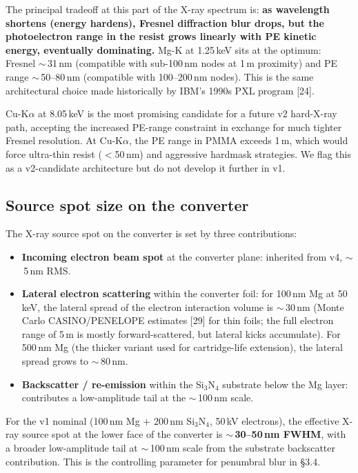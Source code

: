 \documentclass[11pt,letterpaper]{article}
\begin{document}
The principal tradeoff at this part of the X-ray spectrum is: \textbf{as wavelength shortens (energy hardens), Fresnel diffraction blur drops, but the photoelectron range in the resist grows linearly with PE kinetic energy, eventually dominating.} Mg-K at 1.25\,keV sits at the optimum: Fresnel $\sim$\,31\,nm (compatible with sub-100\,nm nodes at 1\,\textmu m proximity) and PE range $\sim$\,50--80\,nm (compatible with 100--200\,nm nodes). This is the same architectural choice made historically by IBM's 1990s PXL program [24].

Cu-K$\alpha$ at 8.05\,keV is the most promising candidate for a future v2 hard-X-ray path, accepting the increased PE-range constraint in exchange for much tighter Fresnel resolution. At Cu-K$\alpha$, the PE range in PMMA exceeds 1\,\textmu m, which would force ultra-thin resist ($<$50\,nm) and aggressive hardmask strategies. We flag this as a v2-candidate architecture but do not develop it further in v1.

\subsection{Source spot size on the converter}

The X-ray source spot on the converter is set by three contributions:

\begin{itemize}[leftmargin=1.6em]
  \item \textbf{Incoming electron beam spot} at the converter plane: inherited from v4, $\sim$\,5\,nm RMS.
  \item \textbf{Lateral electron scattering} within the converter foil: for 100\,nm Mg at 50\,keV, the lateral spread of the electron interaction volume is $\sim$\,30\,nm (Monte Carlo CASINO/PENELOPE estimates [29] for thin foils; the full electron range of 5\,\textmu m is mostly forward-scattered, but lateral kicks accumulate). For 500\,nm Mg (the thicker variant used for cartridge-life extension), the lateral spread grows to $\sim$\,80\,nm.
  \item \textbf{Backscatter / re-emission} within the Si$_3$N$_4$ substrate below the Mg layer: contributes a low-amplitude tail at the $\sim$\,100\,nm scale.
\end{itemize}

For the v1 nominal (100\,nm Mg + 200\,nm Si$_3$N$_4$, 50\,kV electrons), the effective X-ray source spot at the lower face of the converter is \textbf{$\sim$\,30--50\,nm FWHM}, with a broader low-amplitude tail at $\sim$\,100\,nm scale from the substrate backscatter contribution. This is the controlling parameter for penumbral blur in \S 3.4.
\end{document}
